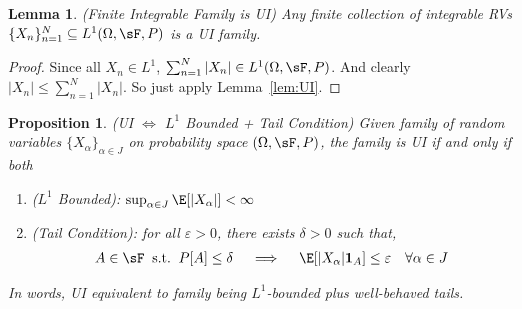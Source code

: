 \documentclass[12pt]{article}
\theoremstyle{plain}
\newtheorem{lem}[thm]{Lemma}
\newtheorem{prop}[thm]{Proposition}
\theoremstyle{definition}
\theoremstyle{remark}
\newcommand{\one}[1]{\mathbf{1}_{#1}}
\newcommand{\sumnN}{\sum^N_{n=1}}
\newcommand{\nN}{_{n=1}^N}
\begin{document}
\begin{lem}\emph{(Finite Integrable Family is UI)}
Any finite collection of integrable RVs
$\{X_n\}\nN\subseteq L^1(\Omega,\sF,P)$ is a UI family.
\end{lem}
\begin{proof}
Since all $X_n\in L^1$,
$\sumnN |X_n| \in L^1(\Omega,\sF,P)$.
And clearly $|X_n|\leq \sumnN |X_n|$.
So just apply Lemma~\ref{lem:UI}.
\end{proof}

\begin{prop}\emph{(UI $\iff$ $L^1$ Bounded + Tail Condition)}
Given family of random variables $\{X_\alpha\}_{\alpha\in J}$
on probability space $(\Omega,\sF,P)$, the
family is UI if and only if both
\begin{enumerate}[label=\emph{(\roman*)}]
  \item
    \emph{($L^1$ Bounded):}
    $\sup_{\alpha \in J} \E[|X_\alpha|]<\infty$
  \item
    \emph{(Tail Condition):}
    for all $\varepsilon>0$, there exists $\delta>0$ such that,
    \begin{align*}
      A\in \sF
      \;\;\text{s.t.}\;\;
      P[A]\leq \delta
      \quad\implies\quad
      \E[|X_\alpha|\one{A}]\leq\varepsilon
      \quad\forall \alpha\in J
    \end{align*}
\end{enumerate}
In words, UI equivalent to family being $L^1$-bounded plus well-behaved
tails.
\end{prop}
\end{document}
